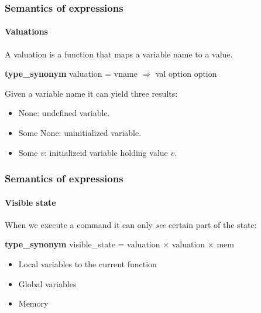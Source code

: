 \begin{frame}[fragile]
\frametitle{Semantics of expressions}
\framesubtitle{Valuations}

A valuation is a function that maps a variable name to a value.

\bigskip
\pause

\textbf{type\_synonym} valuation = vname $\Rightarrow$ val option option

\bigskip

\pause
Given a variable name it can yield three results:

\bigskip

\pause
\begin{itemize}
\item{None: undefined variable.}
\pause
\item{Some None: uninitialized variable.}
\pause
\item{Some $v$: initializeid variable holding value $v$.}
\end{itemize}


\end{frame}


\begin{frame}
\frametitle{Semantics of expressions}
\framesubtitle{Visible state}

When we execute a command it can only \textit{see} certain part of the state:

\bigskip
\pause

\textbf{type\_synonym} visible\_state = valuation $\times$ valuation $\times$ mem

\bigskip
\pause
\begin{itemize}
\item{Local variables to the current function}
\pause
\item{Global variables}
\pause
\item{Memory}
\end{itemize}


\end{frame}


